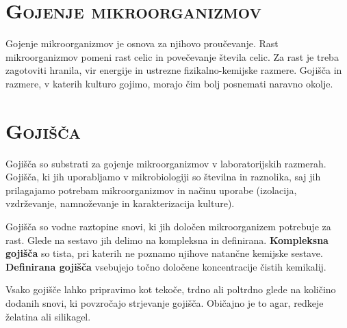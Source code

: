 \documentclass[12pt, a4paper]{report}
\begin{document}
\section{\textsc{Gojenje mikroorganizmov}}

Gojenje mikroorganizmov je osnova za njihovo proučevanje. Rast mikroorganizmov pomeni rast celic in povečevanje števila celic. Za rast je treba zagotoviti hranila, vir energije in ustrezne fizikalno-kemijske razmere. Gojišča in razmere, v katerih kulturo gojimo, morajo čim bolj posnemati naravno okolje.

\section{\textsc{Gojišča}}

Gojišča so substrati za gojenje mikroorganizmov v laboratorijskih razmerah. Gojišča, ki jih uporabljamo v mikrobiologiji so številna in raznolika, saj jih prilagajamo potrebam mikroorganizmov in načinu uporabe (izolacija, vzdrževanje, namnoževanje in karakterizacija kulture).

Gojišča so vodne raztopine snovi, ki jih določen mikroorganizem potrebuje za rast. Glede na sestavo jih delimo na kompleksna in definirana. \textbf{Kompleksna gojišča} so tista, pri katerih ne poznamo njihove natančne kemijske sestave. \textbf{Definirana gojišča} vsebujejo točno določene koncentracije čistih kemikalij.

Vsako gojišče lahko pripravimo kot tekoče, trdno ali poltrdno glede na količino dodanih snovi, ki povzročajo strjevanje gojišča. Običajno je to agar, redkeje želatina ali silikagel.
\end{document}
